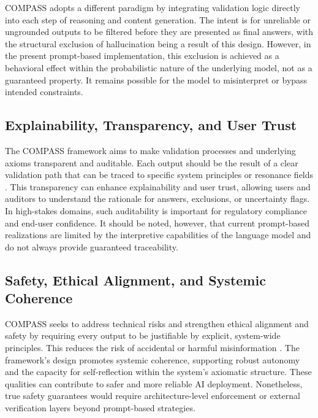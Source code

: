 \documentclass[11pt,a4paper]{article}
\begin{document}
COMPASS adopts a different paradigm by integrating validation logic directly into each step of reasoning and content generation. The intent is for unreliable or ungrounded outputs to be filtered before they are presented as final answers, with the structural exclusion of hallucination being a result of this design. However, in the present prompt-based implementation, this exclusion is achieved as a behavioral effect within the probabilistic nature of the underlying model, not as a guaranteed property. It remains possible for the model to misinterpret or bypass intended constraints.

\subsection{Explainability, Transparency, and User Trust}

The COMPASS framework aims to make validation processes and underlying axioms transparent and auditable. Each output should be the result of a clear validation path that can be traced to specific system principles or resonance fields \cite{gunning2019xai,chen2021knowledge}. This transparency can enhance explainability and user trust, allowing users and auditors to understand the rationale for answers, exclusions, or uncertainty flags. In high-stakes domains, such auditability is important for regulatory compliance and end-user confidence. It should be noted, however, that current prompt-based realizations are limited by the interpretive capabilities of the language model and do not always provide guaranteed traceability.

\subsection{Safety, Ethical Alignment, and Systemic Coherence}

COMPASS seeks to address technical risks and strengthen ethical alignment and safety by requiring every output to be justifiable by explicit, system-wide principles. This reduces the risk of accidental or harmful misinformation \cite{yang2024trustworthy,bai2022constitutional}. The framework’s design promotes systemic coherence, supporting robust autonomy and the capacity for self-reflection within the system’s axiomatic structure. These qualities can contribute to safer and more reliable AI deployment. Nonetheless, true safety guarantees would require architecture-level enforcement or external verification layers beyond prompt-based strategies.
\end{document}
